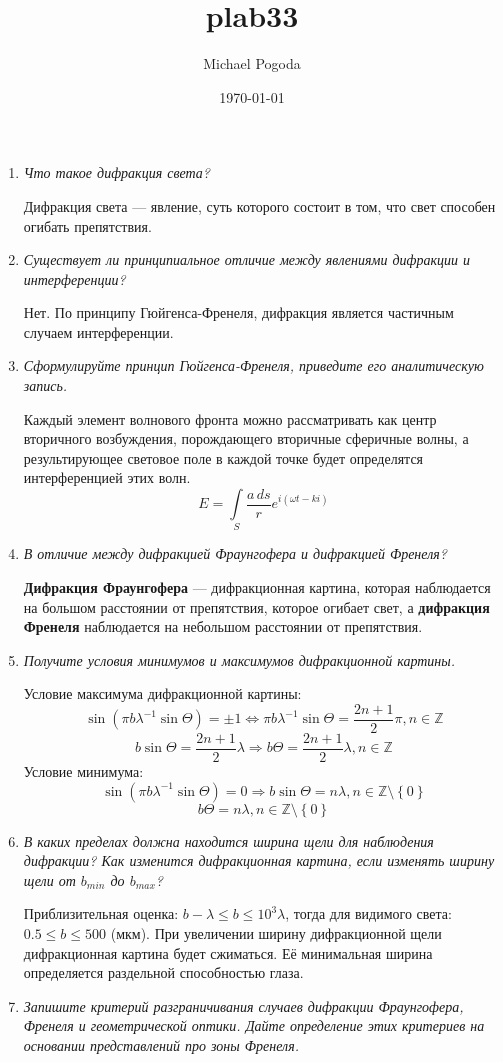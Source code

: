 \documentclass[a4paper,10pt,notitlepage,pdftex,headsepline]{scrartcl}
\author{Michael Pogoda}
\title{plab33}
\date{\today}
\begin{document}
\begin{enumerate}
\item \textit{Что такое дифракция света?}

Дифракция света --- явление, суть которого состоит в том, что свет способен огибать препятствия.
\item \textit{Существует ли принципиальное отличие между явлениями дифракции и интерференции?}

Нет. По принципу Гюйгенса-Френеля, дифракция является частичным случаем интерференции.
\item \textit{Сформулируйте принцип Гюйгенса-Френеля, приведите его аналитическую запись.}

Каждый элемент волнового фронта можно рассматривать как центр вторичного возбуждения, порождающего вторичные сферичные волны, а результирующее световое поле в каждой точке будет определятся интерференцией этих волн.
$$E = \int\limits_S\frac{a\,ds}re^{i(\omega t-ki)}$$
\item \textit{В отличие между дифракцией Фраунгофера и дифракцией Френеля?}

\textbf{Дифракция Фраунгофера} --- дифракционная картина, которая наблюдается на большом расстоянии от препятствия, которое огибает свет, а \textbf{дифракция Френеля} наблюдается на небольшом расстоянии от препятствия.
\item \textit{Получите условия минимумов и максимумов дифракционной картины.}

Условие максимума дифракционной картины:
$$\sin\left( \pi b \lambda^{-1}\sin\Theta\right) = \pm 1 \Leftrightarrow \pi b \lambda^{-1} \sin\Theta = \frac{2n + 1}{2}\pi, n\in \mathbb{Z}$$
$$b\sin\Theta = \frac{2n + 1}{2}\lambda \Rightarrow b\Theta = \frac{2n+1}{2}\lambda, n\in\mathbb{Z}$$
Условие минимума:
$$\sin\left(\pi b \lambda^{-1} \sin\Theta\right) = 0 \Rightarrow b \sin\Theta = n\lambda, n\in\mathbb{Z}\setminus\left\{0\right\}$$
$$b\Theta = n\lambda, n\in\mathbb{Z}\setminus\left\{0\right\}$$
\item \textit{В каких пределах должна находится ширина щели для наблюдения дифракции? Как изменится дифракционная картина, если изменять ширину щели от $b_{min}$ до $b_{max}$?}

Приблизительная оценка: $b - \lambda \leqslant b \leqslant 10^3 \lambda$, тогда для видимого света: $0.5 \leqslant b \leqslant 500$ (мкм).
При увеличении ширину дифракционной щели дифракционная картина будет сжиматься.
Её минимальная ширина определяется раздельной способностью глаза.
\item \textit{Запишите критерий разграничивания случаев дифракции Фраунгофера, Френеля и геометрической оптики. Дайте определение этих критериев на основании представлений про зоны Френеля.}


\end{enumerate}
\end{document}
